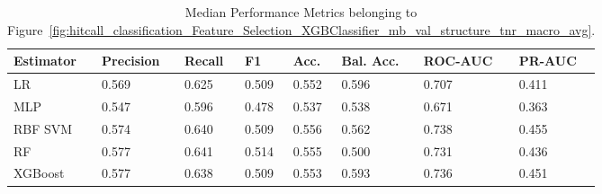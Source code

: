 \begin{longtable}{llllllll}
\caption{Median Performance Metrics belonging to Figure~\ref{fig:hitcall_classification_Feature_Selection_XGBClassifier_mb_val_structure_tnr_macro_avg}.}\label{tab:table:hitcall_classification_feature_selection_xgbclassifier_mb_val_structure_tnr_macro_avg}\\
\toprule
\midrule
\small Estimator & \small Precision & \small Recall & \small F1 & \small Acc. & \small Bal. Acc. & \small ROC-AUC & \small PR-AUC\\
\hline
LR & 0.569 & 0.625 & 0.509 & 0.552 & 0.596 & 0.707 & 0.411\\
MLP & 0.547 & 0.596 & 0.478 & 0.537 & 0.538 & 0.671 & 0.363\\
RBF SVM & 0.574 & 0.640 & 0.509 & 0.556 & 0.562 & 0.738 & 0.455\\
RF & 0.577 & 0.641 & 0.514 & 0.555 & 0.500 & 0.731 & 0.436\\
XGBoost & 0.577 & 0.638 & 0.509 & 0.553 & 0.593 & 0.736 & 0.451\\
\bottomrule
\end{longtable}